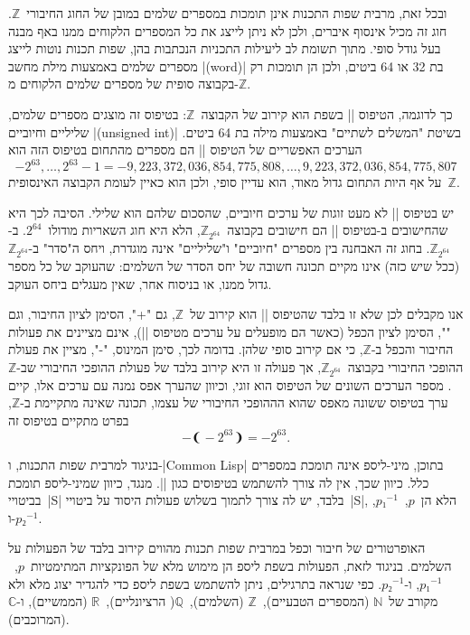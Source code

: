ובכל זאת, מרבית שפות התכנות אינן תומכות במספרים שלמים במובן של החוג
החיבורי~$ℤ$. חוג זה מכיל אינסוף איברים, ולכן לא ניתן לייצג את כל המספרים
הלקוחים ממנו באף מבנה בעל גודל סופי. מתוך תשומת לב ליעילות התכניות הנכתבות בהן,
שפות תכנות נוטות לייצג מספרים שלמים באמצעות מילת מחשב \E|(word)| בת 32 או 64
ביטים, ולכן הן תומכות רק בקבוצה סופית של מספרים שלמים הלקוחים מ-$ℤ$.

כך לדוגמה, הטיפוס \E|| בשפת \Java הוא קירוב של הקבוצה~$ℤ$: בטיפוס זה מוצגים
מספרים שלמים, שליליים וחיוביים \E|(unsigned int)| בשיטת "המשלים לשתיים" באמצעות מילה בת
64 ביטים.
הערכים האפשריים של הטיפוס \E|| הם מספרים מהתחום
בטיפוס הזה הוא \begin{equation}
-2^{63},…,2^{63}-1=-9,223,372,036,854,775,808,…,9,223,372,036,854,775,807
\end{equation}
על אף היות התחום גדול מאוד, הוא עדיין סופי, ולכן הוא כאיין לעומת
הקבוצה האינסופית~$ℤ$.

יש בטיפוס \E|| לא מעט זוגות של ערכים חיוביים, שהסכום שלהם הוא שלילי.
הסיבה לכך היא שהחישובים ב-\CPL בטיפוס \E|| הם חישובים
בקבוצה~$ℤ_{2^{64}}$, הלא היא חוג השאריות מודולו~$2^{64}$. ב-$ℤ_{2^{64}}$. בחוג
זה האבחנה בין מספרים "חיוביים" ו"שליליים" אינה מוגדרת, ויחס ה"סדר"
ב-$ℤ_{2^{64}}$ (ככל שיש כזה) אינו מקיים תכונה חשובה של יחס הסדר של השלמים:
שהעוקב של כל מספר גדול ממנו, או בניסוח אחר, שאין מעגלים ביחס העוקב.

אנו מקבלים לכן שלא זו בלבד שהטיפוס \E|| הוא קירוב של~$ℤ$, גם "\cc+",
הסימן לציון החיבור, וגם "\cc*", הסימן לציון הכפל \Java (כאשר הם
מופעלים על ערכים מטיפוס \E||), אינם מציינים את פעולות החיבור והכפל
ב-$ℤ$, כי אם קירוב סופי שלהן. בדומה לכך, סימן המינוס, "\cc-", מציין את פעולת
ההופכי החיבורי בקבוצה~$ℤ_{2^{64}}$, אך פעולה זו היא קירוב בלבד של פעולת ההופכי
החיבורי שב-$ℤ$. מספר הערכים השונים של הטיפוס  הוא זוגי, וכיוון
שהערך אפס נמנה עם ערכים אלו, קיים ערך בטיפוס ששונה מאפס שהוא הההופכי החיבורי של
עצמו,
תכונה שאינה מתקיימת ב-$ℤ$, בפרט מתקיים בטיפוס זה \begin{equation*}
-❨-2^{63}❩=-2^{63}.
\end{equation*}

בניגוד למרבית שפות התכנות, ו-\E|Common Lisp| בתוכן, מיני-ליספ אינה תומכת
במספרים כלל. כיוון שכך, אין לה צורך להשתמש בטיפוסים כגון \E||. מנגד,
כיוון שמיני-ליספ תומכת בביטויי~\E|S| בלבד, יש לה צורך לתמוך בשלוש פעולות היסוד
על ביטויי~\E|S|, הלא הן~$p$,~$p₁^{-1}$, ו-$p₂^{-1}$.

האופרטורים של חיבור וכפל במרבית שפות תכנות מהווים קירוב בלבד של הפעולות על
השלמים. בניגוד לזאת, הפעולות בשפת ליספ הן מימוש מלא של הפונקציות
המתימטיות~$p$,~$p₁^{-1}$, ו-$p₂^{-1}$. כפי שנראה בתרגילים, ניתן להשתמש בשפת
ליספ כדי להגדיר יצוג מלא ולא מקורב של~$ℕ$ (המספרים הטבעיים),~$ℤ$ (השלמים),~$ℚ$(
הרציונליים),~$ℝ$ (הממשיים), ו-$ℂ$ (המרוכבים).

